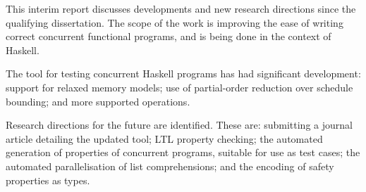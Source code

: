 This interim report discusses developments and new research directions
since the qualifying dissertation. The scope of the work is improving
the ease of writing correct concurrent functional programs, and is
being done in the context of Haskell.

The \dejafu{} tool for testing concurrent Haskell programs has had
significant development: support for relaxed memory models; use of
partial-order reduction over schedule bounding; and more supported
operations.

Research directions for the future are identified. These are:
submitting a journal article detailing the updated \dejafu{} tool; LTL
property checking; the automated generation of properties of
concurrent programs, suitable for use as test cases; the automated
parallelisation of list comprehensions; and the encoding of safety
properties as types.
